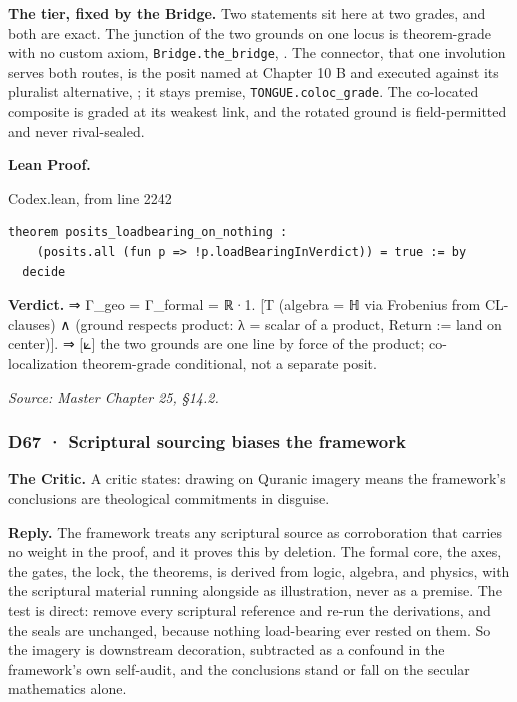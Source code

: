 \documentclass[10pt,twocolumn]{article}
\begin{document}
\textbf{The tier, fixed by the Bridge.} Two statements sit here at two
grades, and both are exact. The junction of the two grounds on one locus
is theorem-grade with no custom axiom, \texttt{Bridge.the\_bridge},
\texttt{}. The connector, that one
involution serves both routes, is the posit named at Chapter 10 B and
executed against its pluralist alternative,
\texttt{}; it stays
premise, \texttt{TONGUE.coloc\_grade}. The co-located composite is
graded at its weakest link, and the rotated ground is field-permitted
and never rival-sealed.

\textbf{Lean Proof.}

\begin{leanexcerpt}{Codex.lean, from line 2242}
\begin{lstlisting}[style=leanx,firstnumber=2242]
theorem posits_loadbearing_on_nothing :
    (posits.all (fun p => !p.loadBearingInVerdict)) = true := by
  decide
\end{lstlisting}
\end{leanexcerpt}

\textbf{Verdict.} ⇒ Γ\_geo = Γ\_formal = ℝ·1. {[}T \textbar{} (algebra =
ℍ via Frobenius from CL-clauses) ∧ (ground respects product: λ = scalar
of a product, Return := land on center){]}. ⇒ {[}⟀{]} the two grounds
are one line by force of the product; co-localization theorem-grade
conditional, not a separate posit.

\emph{Source: Master Chapter 25, §14.2.}

\hypertarget{d67-scriptural-sourcing-biases-the-framework}{%
\subsubsection{D67 · Scriptural sourcing biases the
framework}\label{d67-scriptural-sourcing-biases-the-framework}}

\textbf{The Critic.} A critic states: drawing on Quranic imagery means
the framework's conclusions are theological commitments in disguise.

\textbf{Reply.} The framework treats any scriptural source as
corroboration that carries no weight in the proof, and it proves this by
deletion. The formal core, the axes, the gates, the lock, the theorems,
is derived from logic, algebra, and physics, with the scriptural
material running alongside as illustration, never as a premise. The test
is direct: remove every scriptural reference and re-run the derivations,
and the seals are unchanged, because nothing load-bearing ever rested on
them. So the imagery is downstream decoration, subtracted as a confound
in the framework's own self-audit, and the conclusions stand or fall on
the secular mathematics alone.
\end{document}
